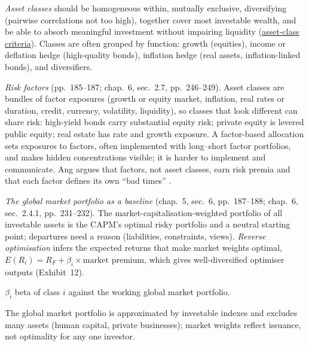 \begin{qfmethod}\label{meth:asset-class-factor-specification}
 \emph{Asset classes} \citep[chap.~5, sec.~6.1, pp.~180--188]{portfolio-management-in-practice-v1-2020} should be homogeneous within, mutually exclusive, diversifying (pairwise correlations not too high), together cover most investable wealth, and be able to absorb meaningful investment without impairing liquidity (\hyperref[meth:asset-class-portfolio-construction]{asset-class criteria}). Classes are often grouped by function: growth (equities), income or deflation hedge (high-quality bonds), inflation hedge (real assets, inflation-linked bonds), and diversifiers.

\emph{Risk factors} (pp.~185--187; chap.~6, sec.~2.7, pp.~246--249). Asset classes are bundles of factor exposures (growth or equity market, inflation, real rates or duration, credit, currency, volatility, liquidity), so classes that look different can share risk: high-yield bonds carry substantial equity risk; private equity is levered public equity; real estate has rate and growth exposure. A factor-based allocation sets exposures to factors, often implemented with long--short factor portfolios, and makes hidden concentrations visible; it is harder to implement and communicate. Ang argues that factors, not asset classes, earn risk premia and that each factor defines its own ``bad times'' \citep[chap.~6, pp.~193--206]{s7-ang}.

\emph{The global market portfolio as a baseline} (chap.~5, sec.~6, pp.~187--188; chap.~6, sec.~2.4.1, pp.~231--232). The market-capitalisation-weighted portfolio of all investable assets is the CAPM's optimal risky portfolio and a neutral starting point; departures need a reason (liabilities, constraints, views). \emph{Reverse optimisation} infers the expected returns that make market weights optimal, $E(R_i)=R_F+\beta_i\times\text{market premium}$, which gives well-diversified optimiser outputs (Exhibit~12).

 $\beta_i$ beta of class $i$ against the working global market portfolio.

 The global market portfolio is approximated by investable indexes and excludes many assets (human capital, private businesses); market weights reflect issuance, not optimality for any one investor.


\end{qfmethod}
